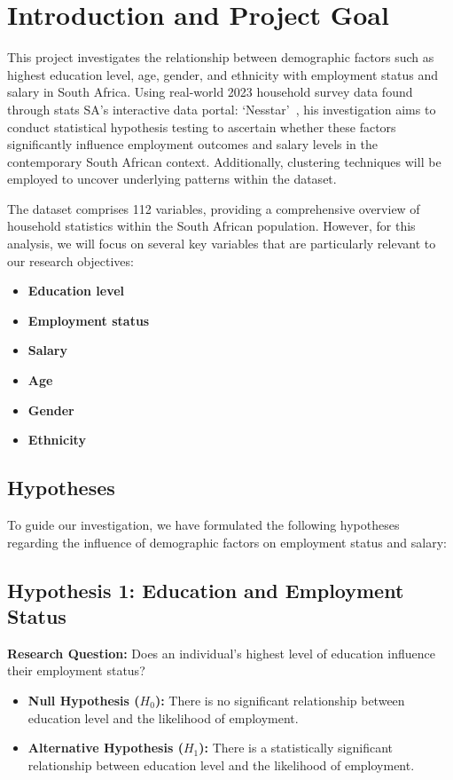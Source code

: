 \section{Introduction and Project Goal}

This project investigates the relationship between demographic factors such as highest education level, age, gender, and ethnicity with employment status and salary in South Africa. 
Using real-world 2023 household survey data found through stats SA's interactive data portal: `Nesstar'~\cite{StatsSA_GHS2023}, his investigation aims to conduct statistical hypothesis testing to ascertain whether these factors significantly influence employment outcomes and salary levels in the contemporary South African context. 
Additionally, clustering techniques will be employed to uncover underlying patterns within the dataset.

The dataset comprises 112 variables, providing a comprehensive overview of household statistics within the South African population. However, for this analysis, we will focus on several key variables that are particularly relevant to our research objectives:
\begin{itemize}
    \item \textbf{Education level}
    \item \textbf{Employment status}
    \item \textbf{Salary}
    \item \textbf{Age}
    \item \textbf{Gender}
    \item \textbf{Ethnicity}
\end{itemize}

\subsection{Hypotheses}
To guide our investigation, we have formulated the following hypotheses regarding the influence of demographic factors on employment status and salary:

\subsection{Hypothesis 1: Education and Employment Status}
\textbf{Research Question:} Does an individual's highest level of education influence their employment status?

\begin{itemize}
    \item \textbf{Null Hypothesis ($H_0$):} There is no significant relationship between education level and the likelihood of employment.
    \item \textbf{Alternative Hypothesis ($H_1$):} There is a statistically significant relationship between education level and the likelihood of employment.
\end{itemize}

